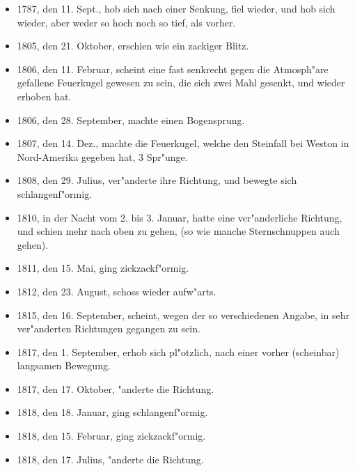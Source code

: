 \documentclass[a4paper, 11pt, oneside, polutonikogreek, german]{article}
\begin{document}
\begin{itemize}
    \item 1787, den 11. Sept., hob sich nach einer Senkung, fiel wieder, und hob sich wieder, aber weder so hoch noch so tief, als vorher.
    \item 1805, den 21. Oktober, erschien wie ein zackiger Blitz.
    \item 1806, den 11. Februar, scheint eine fast senkrecht gegen die Atmosph"are gefallene Feuerkugel gewesen zu sein, die sich zwei Mahl gesenkt, und wieder erhoben hat.
    \item 1806, den 28. September, machte einen Bogensprung.
    \item 1807, den 14. Dez., machte die Feuerkugel, welche den Steinfall bei Weston in Nord-Amerika gegeben hat, 3 Spr"unge.
    \item 1808, den 29. Julius, ver"anderte ihre Richtung, und bewegte sich schlangenf"ormig.
    \item 1810, in der Nacht vom 2. bis 3. Januar, hatte eine ver"anderliche Richtung, und schien mehr nach oben zu gehen, (so wie manche Sternschnuppen auch gehen).
    \item 1811, den 15. Mai, ging zickzackf"ormig.
    \item 1812, den 23. August, schoss wieder aufw"arts.
    \item 1815, den 16. September, scheint, wegen der so verschiedenen Angabe, in sehr ver"anderten Richtungen gegangen zu sein.
    \item 1817, den 1. September, erhob sich pl"otzlich, nach einer vorher (scheinbar) langsamen Bewegung.
    \item 1817, den 17. Oktober, "anderte die Richtung.
    \item 1818, den 18. Januar, ging schlangenf"ormig.
    \item 1818, den 15. Februar, ging zickzackf"ormig.
    \item 1818, den 17. Julius, "anderte die Richtung.
\end{itemize}
\end{document}
